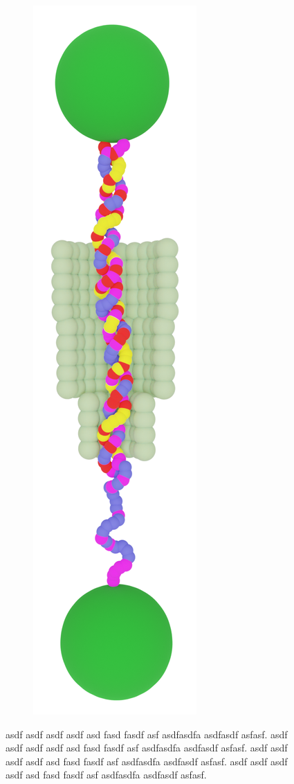 \begin{figure}[ht]
\begin{centering}
\begin{subfigure}[t]{\dimexpr.21\linewidth-1.3em\relax}
  \centering
  \vspace{-0.5cm}
  \includegraphics[width=.4\linewidth,valign=t]{Figures/Rotaxane-70.png}
  \end{subfigure}
  \label{fig:test}
  \end{centering}
  \caption{asdf asdf asdf asdf asd fasd fasdf asf asdfasdfa asdfasdf asfasf. asdf asdf
          asdf asdf asd fasd fasdf asf asdfasdfa asdfasdf asfasf. asdf asdf asdf asdf asd
          fasd fasdf asf asdfasdfa asdfasdf asfasf. asdf asdf asdf asdf asd fasd fasdf
        asf asdfasdfa asdfasdf asfasf.}

\end{figure}



